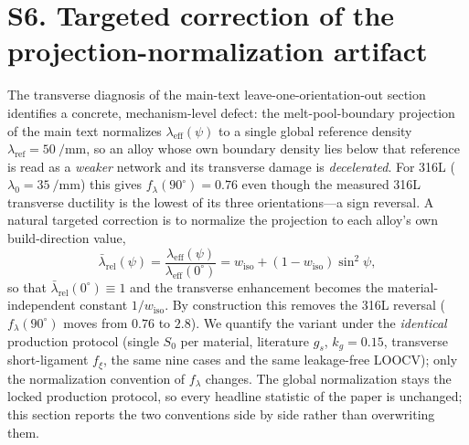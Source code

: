 \documentclass[11pt,a4paper,twocolumn]{article}
\providecommand{\ang}[1]{\ensuremath{#1^{\circ}}}
\begin{document}
\section*{S6. Targeted correction of the projection-normalization artifact}

The transverse diagnosis of the main-text leave-one-orientation-out section identifies a concrete, mechanism-level defect: the melt-pool-boundary projection of the main text normalizes $\lambda_{\mathrm{eff}}(\psi)$ to a single global reference density $\lambda_{\mathrm{ref}}=\SI{50}{\per\milli\meter}$, so an alloy whose own boundary density lies below that reference is read as a \emph{weaker} network and its transverse damage is \emph{decelerated}. For 316L ($\lambda_0=\SI{35}{\per\milli\meter}$) this gives $f_\lambda(\ang{90})=0.76$ even though the measured 316L transverse ductility is the lowest of its three orientations---a sign reversal. A natural targeted correction is to normalize the projection to each alloy's own build-direction value,
\begin{equation}
\bar\lambda_{\mathrm{rel}}(\psi)=\frac{\lambda_{\mathrm{eff}}(\psi)}{\lambda_{\mathrm{eff}}(0^\circ)}=w_{\mathrm{iso}}+(1-w_{\mathrm{iso}})\sin^2\psi,
\label{eq:f_lambda_rel}
\end{equation}
so that $\bar\lambda_{\mathrm{rel}}(\ang{0})\equiv1$ and the transverse enhancement becomes the material-independent constant $1/w_{\mathrm{iso}}$. By construction this removes the 316L reversal ($f_\lambda(\ang{90})$ moves from $0.76$ to $2.8$). We quantify the variant under the \emph{identical} production protocol (single $S_0$ per material, literature $g_s$, $k_g=0.15$, transverse short-ligament $f_\xi$, the same nine cases and the same leakage-free LOOCV); only the normalization convention of $f_\lambda$ changes. The global normalization stays the locked production protocol, so every headline statistic of the paper is unchanged; this section reports the two conventions side by side rather than overwriting them.
\end{document}
